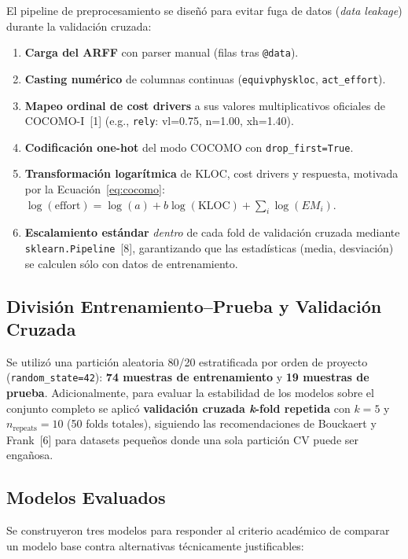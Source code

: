 \documentclass[11pt,a4paper]{article}
\begin{document}
El pipeline de preprocesamiento se diseñó para evitar fuga de datos (\textit{data leakage}) durante la validación cruzada:

\begin{enumerate}[itemsep=2pt,leftmargin=1.5em]
    \item \textbf{Carga del ARFF} con parser manual (filas tras \texttt{@data}).
    \item \textbf{Casting numérico} de columnas continuas (\texttt{equivphyskloc}, \texttt{act\_effort}).
    \item \textbf{Mapeo ordinal de cost drivers} a sus valores multiplicativos oficiales de COCOMO-I~[1] (e.g., \texttt{rely}: vl=0.75, n=1.00, xh=1.40).
    \item \textbf{Codificación one-hot} del modo COCOMO con \texttt{drop\_first=True}.
    \item \textbf{Transformación logarítmica} de KLOC, cost drivers y respuesta, motivada por la Ecuación~\ref{eq:cocomo}: $\log(\mathrm{effort}) = \log(a) + b\log(\mathrm{KLOC}) + \sum_i \log(EM_i)$.
    \item \textbf{Escalamiento estándar} \emph{dentro} de cada fold de validación cruzada mediante \texttt{sklearn.Pipeline}~[8], garantizando que las estadísticas (media, desviación) se calculen sólo con datos de entrenamiento.
\end{enumerate}

\subsection{División Entrenamiento--Prueba y Validación Cruzada}

Se utilizó una partición aleatoria 80/20 estratificada por orden de proyecto (\texttt{random\_state=42}): \textbf{74 muestras de entrenamiento} y \textbf{19 muestras de prueba}. Adicionalmente, para evaluar la estabilidad de los modelos sobre el conjunto completo se aplicó \textbf{validación cruzada \textit{k}-fold repetida} con $k=5$ y $n_{\text{repeats}}=10$ (50 folds totales), siguiendo las recomendaciones de Bouckaert y Frank~[6] para datasets pequeños donde una sola partición CV puede ser engañosa.

\subsection{Modelos Evaluados}

Se construyeron tres modelos para responder al criterio académico de comparar un modelo base contra alternativas técnicamente justificables:
\end{document}
